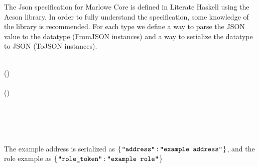 

The Json specification for Marlowe Core is defined in Literate Haskell using the Aeson library. In order
to fully understand the specification, some knowledge of the library is recommended. For each type we
define a way to parse the JSON value to the datatype (FromJSON instances) and a way to serialize the
datatype to JSON (ToJSON instances).



\begin{hscode}\SaveRestoreHook
{}%
%
%
%
\>[B]{}\;\;\;\<[E]%
\\
\>[B]{}\<[5]%
\>[5]{}\;(\;)\mathrel{=}{}\<[E]%
\\
\>[5]{}\<[9]%
\>[9]{}\;[\mskip1.5mu \text{\ttfamily \char34 address\char34}\mathbin{.=}\Varid{address}\mskip1.5mu]{}\<[E]%
\\
\>[B]{}\<[5]%
\>[5]{}\;(\;)\mathrel{=}{}\<[E]%
\\
\>[5]{}\<[9]%
\>[9]{}\;[\mskip1.5mu \text{\ttfamily \char34 role\char95 token\char34}\mathbin{.=}\Varid{name}\mskip1.5mu]{}\<[E]%
\\[\blanklineskip]%
\>[B]{}\mathbin{::}\<[E]%
\\
\>[B]{}\mathrel{=}\;\<[E]%
\\[\blanklineskip]%
\>[B]{}\mathbin{::}\<[E]%
\\
\>[B]{}\mathrel{=}\;\<[E]%
\ColumnHook
\end{hscode}\resethooks
\par

The example address is serialized as \ensuremath{\{\mskip1.5mu \text{\ttfamily \char34 address\char34}\mathbin{:}\text{\ttfamily \char34 example~address\char34}\mskip1.5mu\}}, and the role
example as \ensuremath{\{\mskip1.5mu \text{\ttfamily \char34 role\char95 token\char34}\mathbin{:}\text{\ttfamily \char34 example~role\char34}\mskip1.5mu\}}


